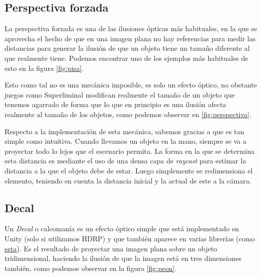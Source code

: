 
\subsection{Perspectiva forzada}
La perspectiva forzada es una de las ilusiones ópticas más habituales, en la que se aprovecha el hecho de que en una imagen plana no hay referencias para medir las distancias para generar la ilusión de que un objeto tiene un tamaño diferente al que realmente tiene. Podemos encontrar uno de los ejemplos más habituales de esto en la figura \ref{fig:pisa}.

Esto como tal no es una mecánica imposible, es solo un efecto óptico, no obstante juegos como Superliminal modifican realmente el tamaño de un objeto que tenemos agarrado de forma que lo que en principio es una ilusión afecta realmente al tamaño de los objetos, como podemos observar en \ref{fig:perspectiva}.

Respecto a la implementación de esta mecánica, sabemos gracias a \cite{superliminal_article} que es tan simple como intuitiva. Cuando llevamos un objeto en la mano, siempre se va a proyectar todo lo lejos que el escenario permita. La forma en la que se determina esta distancia es mediante el uso de una densa capa de \textit{raycast} para estimar la distancia a la que el objeto debe de estar. Luego simplemente se redimensiona el elemento, teniendo en cuenta la distancia inicial y la actual de este a la cámara.



\subsection{Decal}
Un \textit{Decal} o calcomanía es un efecto óptico simple que está implementado en Unity (solo si utilizamos HDRP) y que también aparece en varias librerías (como \href{https://github.com/Anatta336/driven-decals}{esta}). Es el resultado de proyectar una imagen plana sobre un objeto tridimensional, haciendo la ilusión de que la imagen está en tres dimensiones también, como podemos observar en la figura \ref{fig:peon}.

